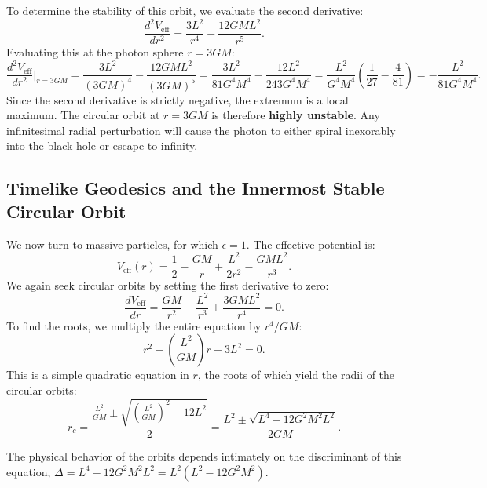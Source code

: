 \documentclass[11pt, a4paper]{report}
\begin{document}
To determine the stability of this orbit, we evaluate the second derivative:
\begin{equation}
\frac{d^{2}V_{\text{eff}}}{dr^{2}} = \frac{3L^{2}}{r^{4}} - \frac{12GML^{2}}{r^{5}}.
\end{equation}
Evaluating this at the photon sphere $r = 3GM$:
\begin{equation}
\frac{d^{2}V_{\text{eff}}}{dr^{2}}\bigg|_{r=3GM} = \frac{3L^{2}}{(3GM)^{4}} - \frac{12GML^{2}}{(3GM)^{5}} = \frac{3L^{2}}{81G^{4}M^{4}} - \frac{12L^{2}}{243G^{4}M^{4}} = \frac{L^{2}}{G^{4}M^{4}}\left(\frac{1}{27} - \frac{4}{81}\right) = -\frac{L^{2}}{81G^{4}M^{4}}.
\end{equation}
Since the second derivative is strictly negative, the extremum is a local maximum. The circular orbit at $r=3GM$ is therefore \textbf{highly unstable}. Any infinitesimal radial perturbation will cause the photon to either spiral inexorably into the black hole or escape to infinity.

\subsection{Timelike Geodesics and the Innermost Stable Circular Orbit}

We now turn to massive particles, for which $\epsilon = 1$. The effective potential is:
\begin{equation}
V_{\text{eff}}(r) = \frac{1}{2} - \frac{GM}{r} + \frac{L^{2}}{2r^{2}} - \frac{GML^{2}}{r^{3}}.
\end{equation}
We again seek circular orbits by setting the first derivative to zero:
\begin{equation}
\frac{dV_{\text{eff}}}{dr} = \frac{GM}{r^{2}} - \frac{L^{2}}{r^{3}} + \frac{3GML^{2}}{r^{4}} = 0.
\end{equation}
To find the roots, we multiply the entire equation by $r^{4}/GM$:
\begin{equation}
r^{2} - \left(\frac{L^{2}}{GM}\right)r + 3L^{2} = 0.
\end{equation}
This is a simple quadratic equation in $r$, the roots of which yield the radii of the circular orbits:
\begin{equation}
\label{eq:circular_radii}
r_{c} = \frac{ \frac{L^{2}}{GM} \pm \sqrt{ \left(\frac{L^{2}}{GM}\right)^{2} - 12L^{2} } }{2} = \frac{L^{2} \pm \sqrt{L^{4} - 12G^{2}M^{2}L^{2}}}{2GM}.
\end{equation}

The physical behavior of the orbits depends intimately on the discriminant of this equation, $\Delta = L^{4} - 12G^{2}M^{2}L^{2} = L^{2}(L^{2} - 12G^{2}M^{2})$. 
\end{document}
